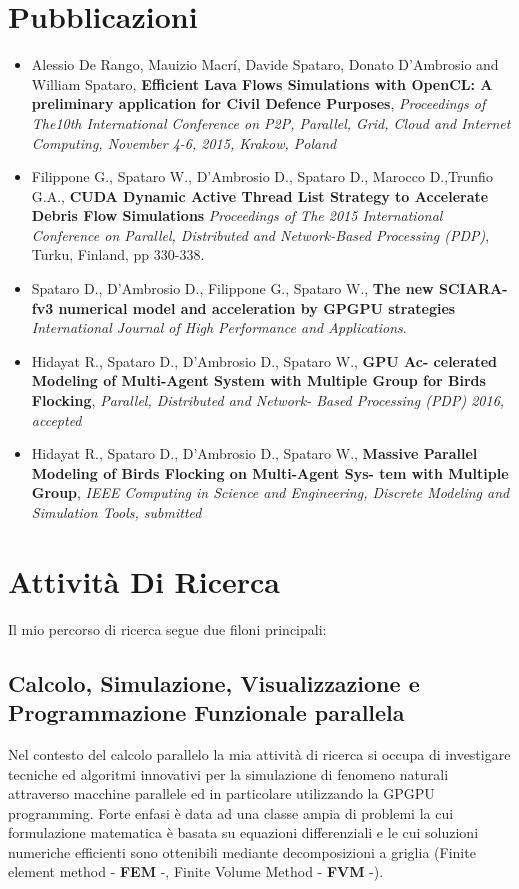 \documentclass[a4paper]{article}
\begin{document}
\section{Pubblicazioni}
 \begin{itemize}
 \item Alessio De Rango, Mauizio Macr\'i, Davide Spataro, Donato D'Ambrosio and
  William Spataro, \textbf{Efficient Lava Flows Simulations with OpenCL: A
  preliminary application for Civil Defence Purposes}, \emph{Proceedings of
  The10th International Conference on P2P, Parallel, Grid, Cloud and Internet
  Computing, November 4-6, 2015, Krakow, Poland}
  
	\item Filippone G., Spataro W., D'Ambrosio D., Spataro D., 
	Marocco D.,Trunfio G.A., \textbf{CUDA Dynamic Active Thread List Strategy 
	to Accelerate Debris Flow Simulations} \emph{Proceedings of The 2015 International Conference on Parallel, 
	Distributed and Network-Based Processing (PDP)}, Turku, Finland, pp 330-338.
	
	\item Spataro D., D'Ambrosio D., Filippone G., Spataro W., \textbf{The new
	SCIARA-fv3 numerical model and acceleration by GPGPU strategies}
	\emph{International Journal of High Performance and Applications}.
	
	\item Hidayat R., Spataro D., D’Ambrosio D., Spataro W., \textbf{GPU Ac-
celerated Modeling of Multi-Agent System with Multiple
Group for Birds Flocking}, \emph{Parallel, Distributed and Network-
Based Processing (PDP) 2016, accepted}
\item Hidayat R., Spataro D., D’Ambrosio D., Spataro W., \textbf{Massive
Parallel Modeling of Birds Flocking on Multi-Agent Sys-
tem with Multiple Group}, \emph{IEEE Computing in Science and
Engineering, Discrete Modeling and Simulation Tools, submitted}
\end{itemize}

\section{Attività Di Ricerca}
Il mio percorso di ricerca segue due filoni principali:
\subsection{Calcolo, Simulazione, Visualizzazione e Programmazione Funzionale
parallela}
 	Nel contesto del calcolo parallelo la mia attività di ricerca si occupa di
  	investigare tecniche ed algoritmi innovativi per la simulazione di fenomeno
  	naturali attraverso macchine parallele ed in particolare utilizzando la GPGPU
  	programming. Forte enfasi è data ad una classe ampia di problemi la cui
  	formulazione matematica è basata su equazioni differenziali e le cui
  	soluzioni numeriche efficienti sono ottenibili mediante decomposizioni a griglia
  	(Finite element method - \textbf{FEM} -, Finite Volume Method - \textbf{FVM}
  	-).
  	
\end{document}
